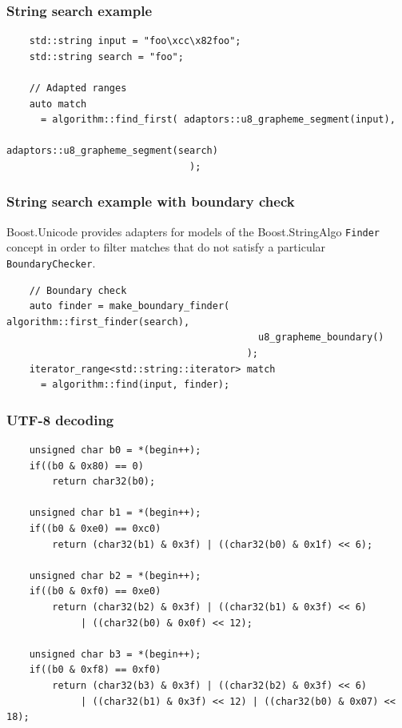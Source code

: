 \documentclass{beamer}
\begin{document}
\begin{frame}[fragile]
	\frametitle{String search example}
	
	\begin{lstlisting}
	std::string input = "foo\xcc\x82foo";
	std::string search = "foo";

	// Adapted ranges
	auto match
	  = algorithm::find_first( adaptors::u8_grapheme_segment(input),
	                              adaptors::u8_grapheme_segment(search)
	                            );
    \end{lstlisting}
	
\end{frame}

\begin{frame}[fragile]
	\frametitle{String search example with boundary check}

	Boost.Unicode provides adapters for models of the Boost.StringAlgo \lstinline{Finder} concept in order to filter matches that do not satisfy a particular \lstinline{BoundaryChecker}.
	\bigskip

	\begin{lstlisting}
	// Boundary check
	auto finder = make_boundary_finder( algorithm::first_finder(search),
	                                        u8_grapheme_boundary()
	                                      );
	iterator_range<std::string::iterator> match
	  = algorithm::find(input, finder);
	\end{lstlisting}

\end{frame}

\begin{frame}[fragile]
	\frametitle{UTF-8 decoding}
	
	\begin{lstlisting}
	unsigned char b0 = *(begin++);
	if((b0 & 0x80) == 0)
	    return char32(b0);
        
	unsigned char b1 = *(begin++);
	if((b0 & 0xe0) == 0xc0)
	    return (char32(b1) & 0x3f) | ((char32(b0) & 0x1f) << 6);
        
	unsigned char b2 = *(begin++);
	if((b0 & 0xf0) == 0xe0)
	    return (char32(b2) & 0x3f) | ((char32(b1) & 0x3f) << 6)
	         | ((char32(b0) & 0x0f) << 12);

	unsigned char b3 = *(begin++);
	if((b0 & 0xf8) == 0xf0)
	    return (char32(b3) & 0x3f) | ((char32(b2) & 0x3f) << 6)
	         | ((char32(b1) & 0x3f) << 12) | ((char32(b0) & 0x07) << 18);
	\end{lstlisting}
\end{frame}
\end{document}

